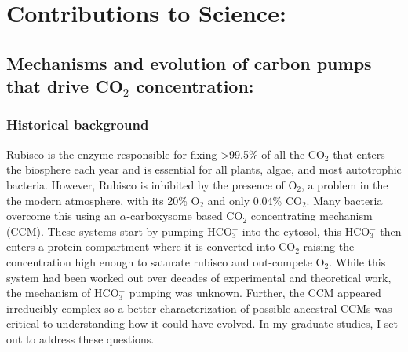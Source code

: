 \documentclass{article}
\begin{document}
\section*{Contributions to Science:}
\newrefsection
\subsection{Mechanisms and evolution of carbon pumps that drive CO$_2$ concentration:}
\subsubsection{Historical background}
Rubisco is the enzyme responsible for fixing >99.5\% of all the CO$_2$ that enters the biosphere each year and is essential for all plants, algae, and most autotrophic bacteria. 
However, Rubisco is inhibited by the presence of O$_2$, a problem in the the modern atmosphere, with its 20\% O$_2$ and only 0.04\% CO$_2$.
Many bacteria overcome this using an $\alpha$-carboxysome based CO$_2$ concentrating mechanism (CCM).
These systems start by pumping HCO$_{3}^{-}$ into the cytosol, this HCO$_{3}^{-}$ then enters a protein compartment where it is converted into CO$_2$ raising the concentration high enough to saturate rubisco and out-compete O$_2$.
While this system had been worked out over decades of experimental and theoretical work, the mechanism of HCO$_{3}^{-}$ pumping was unknown.
Further, the CCM appeared irreducibly complex so a better characterization of possible ancestral CCMs was critical to understanding how it could have evolved.
In my graduate studies, I set out to address these questions.
%
\end{document}
